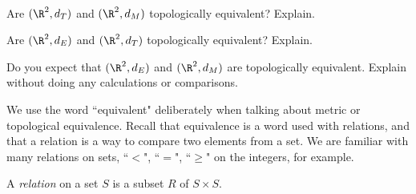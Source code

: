 \begin{activity} ~
\ba
\item Are $(\R^2,d_T)$ and $(\R^2, d_M)$ topologically equivalent? Explain.


\begin{comment}

Let $x = (x_1,x_2)$ and $y=(y_1,y_2)$ be in $\R^2$. Notice that 
\[d_M(x,y) = \max\{| x_1-y_1 |, | x_2-y_2 |\} \leq | x_1-y_1 | + | x_2-y_2 | = d_T(x,y).\]
Also,
\[d_T(x,y) = | x_1-y_1 | + | x_2-y_2 | \leq 2\max\{| x_1-y_1 |, | x_2-y_2 |\} = 2d_M(x,y).\]
So $(\R^2,d_T)$ and $(\R^2, d_M)$ are topologically equivalent. 

\end{comment}

\item Are $(\R^2,d_E)$ and $(\R^2, d_T)$ topologically equivalent? Explain.


\begin{comment}

Let $x = (x_1,x_2)$ and $y=(y_1,y_2)$ be in $\R^2$. Notice that 
\[d_E(x,y) = \sqrt{(x_1-y_1)^2 + (x_2-y_2)^2} \leq \sqrt{(x_1-y_1)^2} + \sqrt{(x_2-y_2)^2} =  | x_1-y_1 | + | x_2-y_2 | \leq d_T(x,y).\]
Also,
\[d_T(x,y) = | x_1-y_1 | + | x_2-y_2 | = \sqrt{(x_1-y_1)^2} + \sqrt{(x_2-y_2)^2} \leq \sqrt{(x_1-y_1)^2+(x_2-y_2)^2} + \sqrt{(x_1-y_1)^2+(x_2-y_2)^2} = 2d_E(x,y).\]
So $(\R^2,d_T)$ and $(\R^2, d_T)$ are topologically equivalent. 

\end{comment}

\item Do you expect that $(\R^2,d_E)$ and $(\R^2, d_M)$ are topologically equivalent. Explain without doing any calculations or comparisons.



 
\ea

\end{activity}



\label{sec_relations}
We use the word ``equivalent" deliberately when talking about metric or topological equivalence. Recall that equivalence is a word used with relations, and that a relation is a way to compare two elements from a set. We are familiar with many relations on sets, ``$<$", ``$=$", ``$\geq$" on the integers, for example.  



\begin{definition} A \emph{relation} on a set $S$ is a subset $R$ of $S \times S$.
\end{definition}



